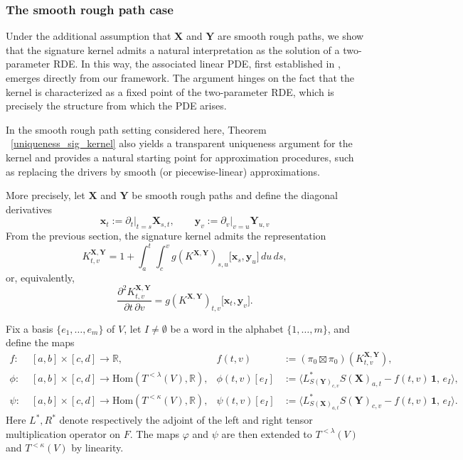 \documentclass{article}%
\begin{document}
\subsubsection{The smooth rough path case}
Under the additional assumption that $\mathbf{X}$ and $\mathbf{Y}$ are smooth rough paths, we show that the signature kernel admits a natural interpretation as the solution of a two-parameter RDE. In this way, the associated linear PDE, first established in \cite{lemercier2024log}, emerges directly from our framework. The argument hinges on the fact that the kernel is characterized as a fixed point of the two-parameter RDE, which is precisely the structure from which the PDE arises.

 

In the smooth rough path setting considered here, Theorem ~\ref{uniqueness_sig_kernel} also yields a transparent uniqueness argument for the kernel and provides a natural starting point for approximation procedures, such as replacing the drivers by smooth (or piecewise-linear) approximations.

More precisely, let $\mathbf{X}$ and $\mathbf{Y}$ be smooth rough paths and define the diagonal derivatives 
\[
\boldsymbol{x}_t := \left.\partial_t\right|_{t=s} \mathbf{X}_{s,t},
\qquad
\boldsymbol{y}_v := \left.\partial_v |_{v=u} \mathbf{Y}_{u,v}\right.
\]
From the previous section, the signature kernel admits the representation
\[
K^{\mathbf{X}, \mathbf{Y}}_{t,v}
= 1 + \int_a^t \int_c^v g\!\left(K^{\mathbf{X}, \mathbf{Y}}\right)_{s,u}
\big[ \boldsymbol{x}_s, \boldsymbol{y}_u \big]\, du\, ds,
\]
or, equivalently,
\[
\frac{\partial^2 K^{\mathbf{X}, \mathbf{Y}}_{t,v}}{\partial t\, \partial v}
= g\!\left(K^{\mathbf{X}, \mathbf{Y}}\right)_{t,v}
\big[ \boldsymbol{x}_t, \boldsymbol{y}_v \big].
\]

Fix a basis $\{e_1,\dots,e_m\}$ of $V$, let $I \neq \emptyset$ be a word in the alphabet $\{1, \dots, m\}$, and define the maps
\[
\begin{aligned}
f \colon\; & [a,b] \times [c,d] \longrightarrow \mathbb{R}, 
& f(t,v) &:= (\pi_0 \boxtimes \pi_0)\!\left( K^{\mathbf{X},\mathbf{Y}}_{t,v} \right), \\[0.5em]
\phi \colon\; & [a,b] \times [c,d] \longrightarrow \mathrm{Hom}\!\left(T^{<\lambda}(V), \mathbb{R}\right), 
& \phi(t,v)[e_I] &:= 
\big\langle L^*_{S(\mathbf{Y})_{c,v}} S(\mathbf{X})_{a,t}
- f(t,v)\,\mathbf{1},\, e_I \big\rangle, \\[0.5em]
\psi \colon\; & [a,b] \times [c,d] \longrightarrow \mathrm{Hom}\!\left(T^{<\kappa}(V), \mathbb{R}\right), 
& \psi(t,v)[e_I] &:= 
\big\langle L^*_{S(\mathbf{X})_{a,t}} S(\mathbf{Y})_{c,v}
- f(t,v)\,\mathbf{1},\, e_I \big\rangle .
\end{aligned}
\]
Here $L^*, R^*$ denote respectively the adjoint of the left and right tensor multiplication operator on $F$. The maps $\varphi$ and $\psi$ are then extended to $T^{<\lambda}(V)$ and $T^{<\kappa}(V)$ by linearity.  \newline
\end{document}
